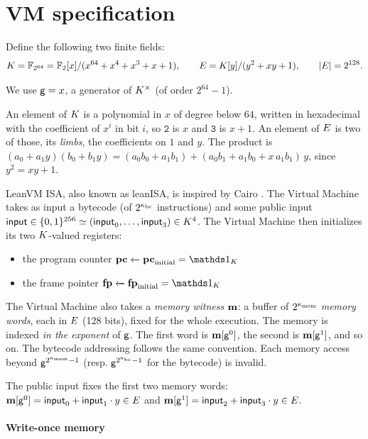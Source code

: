 \section{VM specification}\label{sec:vm}

Define the following two finite fields:
\[
  K=\mathbb{F}_{2^{64}}=\mathbb{F}_2[x]/(x^{64}+x^4+x^3+x+1),
  \qquad
  E=K[y]/(y^2+xy+1),
  \qquad |E|=2^{128}.
\]

We use $\mathsf{g} = x$, a generator of $K^{\times}$ (of order $2^{64}-1$).

An element of $K$ is a polynomial in $x$ of degree below $64$, written in hexadecimal with the coefficient of $x^{i}$ in bit $i$, so $\mathtt{2}$ is $x$ and $\mathtt{3}$ is $x+1$. An element of $E$ is two of those, its \emph{limbs}, the coefficients on $1$ and $y$. The product is $(a_0+a_1y)(b_0+b_1y)=(a_0b_0+a_1b_1)+(a_0b_1+a_1b_0+x\,a_1b_1)\,y$, since $y^2=xy+1$.

\vspace{5mm}

LeanVM ISA, also known as leanISA, is inspired by Cairo \cite{cairo}. The Virtual Machine takes as input a bytecode (of $2^{\kappa_{\mathrm{bc}}}$ instructions) and some public input $\textsf{input} \in \{0,1\}^{256} \simeq (\textsf{input}_0, \dots, \textsf{input}_3) \in K^4$. The Virtual Machine then initializes its two $K$-valued registers:
\begin{itemize}
  \item the program counter $\pc \xleftarrow{} \pc_{\mathrm{initial}} = \one_\K$
  \item the frame pointer $\fp \xleftarrow{} \fp_{\mathrm{initial}} = \one_\K$
\end{itemize}

The Virtual Machine also takes a \textit{memory witness} $\mathbf{m}$: a buffer of $2^{\kappa_{\mathrm{mem}}}$ \textit{memory words}, each in $E$ (128 bits), fixed for the whole execution. The memory is indexed \textit{in the exponent} of $\mathsf{g}$. The first word is $\mathbf{m}[\mathsf{g}^0]$, the second is $\mathbf{m}[\mathsf{g}^1]$, and so on. The bytecode addressing follows the same convention. Each memory access beyond $\mathsf{g}^{2^{\kappa_{\mathrm{mem}}}-1}$ (resp. $\mathsf{g}^{2^{\kappa_{\mathrm{bc}}}-1}$ for the bytecode) is invalid.

The public input fixes the first two memory words: $\mathbf{m}[\mathsf{g}^0] = \textsf{input}_0 + \textsf{input}_1 \cdot y \in E$ and $\mathbf{m}[\mathsf{g}^1] = \textsf{input}_2 + \textsf{input}_3 \cdot y \in E$.

\paragraph{Write-once memory}


